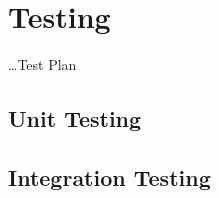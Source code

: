 \chapter{Testing} \label{Chapter:Testing}
 \dots Test Plan
\section{Unit Testing}
\section{Integration Testing}